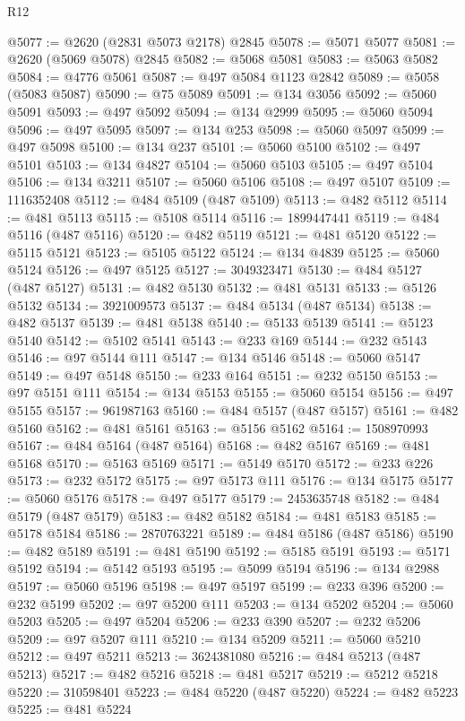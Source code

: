 \begin{lexlean}{R12}
\begin{coremodule}
@5077 := @2620 (@2831 @5073 @2178) @2845
@5078 := @5071 @5077
@5081 := @2620 (@5069 @5078) @2845
@5082 := @5068 @5081
@5083 := @5063 @5082
@5084 := @4776 @5061
@5087 := @497 @5084 @1123 @2842
@5089 := @5058 (@5083 @5087)
@5090 := @75 @5089
@5091 := @134 @3056
@5092 := @5060 @5091
@5093 := @497 @5092
@5094 := @134 @2999
@5095 := @5060 @5094
@5096 := @497 @5095
@5097 := @134 @253
@5098 := @5060 @5097
@5099 := @497 @5098
@5100 := @134 @237
@5101 := @5060 @5100
@5102 := @497 @5101
@5103 := @134 @4827
@5104 := @5060 @5103
@5105 := @497 @5104
@5106 := @134 @3211
@5107 := @5060 @5106
@5108 := @497 @5107
@5109 := 1116352408
@5112 := @484 @5109 (@487 @5109)
@5113 := @482 @5112
@5114 := @481 @5113
@5115 := @5108 @5114
@5116 := 1899447441
@5119 := @484 @5116 (@487 @5116)
@5120 := @482 @5119
@5121 := @481 @5120
@5122 := @5115 @5121
@5123 := @5105 @5122
@5124 := @134 @4839
@5125 := @5060 @5124
@5126 := @497 @5125
@5127 := 3049323471
@5130 := @484 @5127 (@487 @5127)
@5131 := @482 @5130
@5132 := @481 @5131
@5133 := @5126 @5132
@5134 := 3921009573
@5137 := @484 @5134 (@487 @5134)
@5138 := @482 @5137
@5139 := @481 @5138
@5140 := @5133 @5139
@5141 := @5123 @5140
@5142 := @5102 @5141
@5143 := @233 @169
@5144 := @232 @5143
@5146 := @97 @5144 @111
@5147 := @134 @5146
@5148 := @5060 @5147
@5149 := @497 @5148
@5150 := @233 @164
@5151 := @232 @5150
@5153 := @97 @5151 @111
@5154 := @134 @5153
@5155 := @5060 @5154
@5156 := @497 @5155
@5157 := 961987163
@5160 := @484 @5157 (@487 @5157)
@5161 := @482 @5160
@5162 := @481 @5161
@5163 := @5156 @5162
@5164 := 1508970993
@5167 := @484 @5164 (@487 @5164)
@5168 := @482 @5167
@5169 := @481 @5168
@5170 := @5163 @5169
@5171 := @5149 @5170
@5172 := @233 @226
@5173 := @232 @5172
@5175 := @97 @5173 @111
@5176 := @134 @5175
@5177 := @5060 @5176
@5178 := @497 @5177
@5179 := 2453635748
@5182 := @484 @5179 (@487 @5179)
@5183 := @482 @5182
@5184 := @481 @5183
@5185 := @5178 @5184
@5186 := 2870763221
@5189 := @484 @5186 (@487 @5186)
@5190 := @482 @5189
@5191 := @481 @5190
@5192 := @5185 @5191
@5193 := @5171 @5192
@5194 := @5142 @5193
@5195 := @5099 @5194
@5196 := @134 @2988
@5197 := @5060 @5196
@5198 := @497 @5197
@5199 := @233 @396
@5200 := @232 @5199
@5202 := @97 @5200 @111
@5203 := @134 @5202
@5204 := @5060 @5203
@5205 := @497 @5204
@5206 := @233 @390
@5207 := @232 @5206
@5209 := @97 @5207 @111
@5210 := @134 @5209
@5211 := @5060 @5210
@5212 := @497 @5211
@5213 := 3624381080
@5216 := @484 @5213 (@487 @5213)
@5217 := @482 @5216
@5218 := @481 @5217
@5219 := @5212 @5218
@5220 := 310598401
@5223 := @484 @5220 (@487 @5220)
@5224 := @482 @5223
@5225 := @481 @5224

\end{coremodule}
\end{lexlean}
